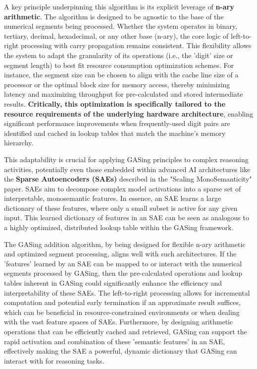 A key principle underpinning this algorithm is its explicit leverage of \textbf{n-ary arithmetic}. The algorithm is designed to be agnostic to the base of the numerical segments being processed. Whether the system operates in binary, tertiary, decimal, hexadecimal, or any other base (n-ary), the core logic of left-to-right processing with carry propagation remains consistent. This flexibility allows the system to adapt the granularity of its operations (i.e., the 'digit' size or segment length) to best fit resource consumption optimization schemes. For instance, the segment size can be chosen to align with the cache line size of a processor or the optimal block size for memory access, thereby minimizing latency and maximizing throughput for pre-calculated and stored intermediate results. \textbf{Critically, this optimization is specifically tailored to the resource requirements of the underlying hardware architecture}, enabling significant performance improvements when frequently-used digit pairs are identified and cached in lookup tables that match the machine's memory hierarchy.

This adaptability is crucial for applying GASing principles to complex reasoning activities, potentially even those embedded within advanced AI architectures like the \textbf{Sparse Autoencoders (SAEs)} described in the "Scaling MonoSemanticity" paper. SAEs aim to decompose complex model activations into a sparse set of interpretable, monosemantic features. In essence, an SAE learns a large dictionary of these features, where only a small subset is active for any given input. This learned dictionary of features in an SAE can be seen as analogous to a highly optimized, distributed lookup table within the GASing framework. 

The GASing addition algorithm, by being designed for flexible n-ary arithmetic and optimized segment processing, aligns well with such architectures. If the 'features' learned by an SAE can be mapped to or interact with the numerical segments processed by GASing, then the pre-calculated operations and lookup tables inherent in GASing could significantly enhance the efficiency and interpretability of these SAEs. The left-to-right processing allows for incremental computation and potential early termination if an approximate result suffices, which can be beneficial in resource-constrained environments or when dealing with the vast feature spaces of SAEs. Furthermore, by designing arithmetic operations that can be efficiently cached and retrieved, GASing can support the rapid activation and combination of these 'semantic features' in an SAE, effectively making the SAE a powerful, dynamic dictionary that GASing can interact with for reasoning tasks.

